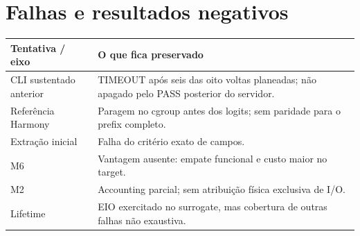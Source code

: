 \clearpage
\section{Falhas e resultados negativos}
\begin{tabularx}{\linewidth}{@{}p{40mm}Y@{}}
\toprule \textbf{Tentativa / eixo} & \textbf{O que fica preservado}\\ \midrule
CLI sustentado anterior & TIMEOUT após seis das oito voltas planeadas; não apagado pelo PASS posterior do servidor.\\
Referência Harmony & Paragem no cgroup antes dos logits; sem paridade para o prefix completo.\\
Extração inicial & Falha do critério exato de campos.\\
M6 & Vantagem ausente: empate funcional e custo maior no target.\\
M2 & Accounting parcial; sem atribuição física exclusiva de I/O.\\
Lifetime & EIO exercitado no surrogate, mas cobertura de outras falhas não exaustiva.\\
\bottomrule
\end{tabularx}

